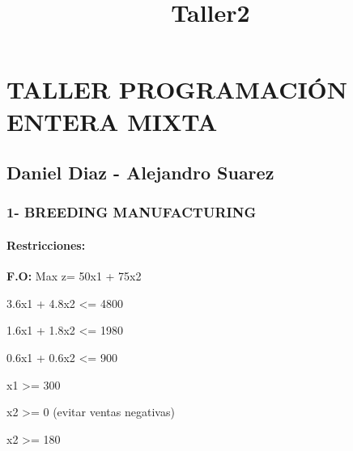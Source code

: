 \documentclass[11pt]{article}
\title{Taller2}
\begin{document}
    
    
    \maketitle
    
    

    
    \section{\texorpdfstring{\textbf{TALLER PROGRAMACIÓN ENTERA
MIXTA}}{TALLER PROGRAMACIÓN ENTERA MIXTA}}\label{taller-programaciuxf3n-entera-mixta}

\subsection{Daniel Diaz - Alejandro
Suarez}\label{daniel-diaz---alejandro-suarez}

    \subsubsection{\texorpdfstring{1- \textbf{BREEDING
MANUFACTURING}}{1- BREEDING MANUFACTURING}}\label{breeding-manufacturing}

\paragraph{Restricciones:}\label{restricciones}

\textbf{F.O:} Max z= 50x1 + 75x2

3.6x1 + 4.8x2 \textless{}= 4800

1.6x1 + 1.8x2 \textless{}= 1980

0.6x1 + 0.6x2 \textless{}= 900

x1 \textgreater{}= 300

x2 \textgreater{}= 0 (evitar ventas negativas)

x2 \textgreater{}= 180
\end{document}
